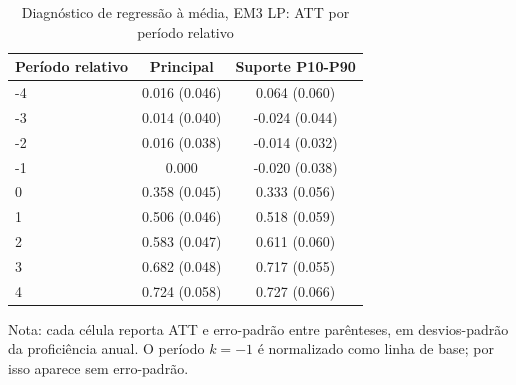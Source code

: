 \begin{table}[!htbp]
\centering
\caption{Diagnóstico de regressão à média, EM3 LP: ATT por período relativo}
\label{tab:ap_event_regmedia_em3_lp}
\vspace{-0.15cm}
\scriptsize
\setlength{\tabcolsep}{4pt}
\renewcommand{\arraystretch}{0.92}
\begin{tabular}{lcc}
\toprule
Período relativo & Principal & Suporte P10-P90 \\
\midrule
-4 & 0.016 (0.046) & 0.064 (0.060) \\
-3 & 0.014 (0.040) & -0.024 (0.044) \\
-2 & 0.016 (0.038) & -0.014 (0.032) \\
-1 & 0.000 & -0.020 (0.038) \\
0 & 0.358 (0.045) & 0.333 (0.056) \\
1 & 0.506 (0.046) & 0.518 (0.059) \\
2 & 0.583 (0.047) & 0.611 (0.060) \\
3 & 0.682 (0.048) & 0.717 (0.055) \\
4 & 0.724 (0.058) & 0.727 (0.066) \\
\bottomrule
\end{tabular}
\begin{flushleft}
\footnotesize Nota: cada célula reporta ATT e erro-padrão entre parênteses, em desvios-padrão da proficiência anual. O período \(k=-1\) é normalizado como linha de base; por isso aparece sem erro-padrão.
\end{flushleft}
\end{table}
